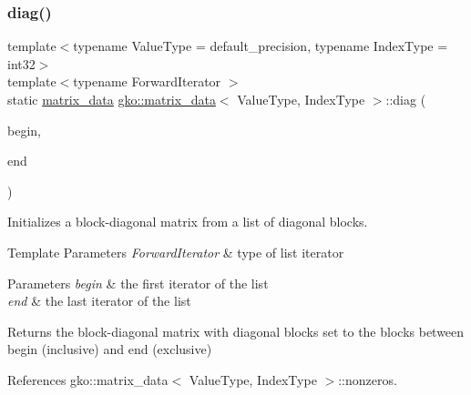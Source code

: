 \subsubsection{\texorpdfstring{diag()}{diag()}\hspace{0.1cm}{\footnotesize\ttfamily [4/5]}}
{\footnotesize\ttfamily template$<$typename Value\+Type = default\+\_\+precision, typename Index\+Type = int32$>$ \\
template$<$typename Forward\+Iterator $>$ \\
static \hyperlink{structgko_1_1matrix__data}{matrix\+\_\+data} \hyperlink{structgko_1_1matrix__data}{gko\+::matrix\+\_\+data}$<$ Value\+Type, Index\+Type $>$\+::diag (\begin{DoxyParamCaption}\item[{Forward\+Iterator}]{begin,  }\item[{Forward\+Iterator}]{end }\end{DoxyParamCaption})\hspace{0.3cm}{\ttfamily [static]}}



Initializes a block-\/diagonal matrix from a list of diagonal blocks. 


\begin{DoxyTemplParams}{Template Parameters}
{\em Forward\+Iterator} & type of list iterator\\
\hline
\end{DoxyTemplParams}

\begin{DoxyParams}{Parameters}
{\em begin} & the first iterator of the list \\
\hline
{\em end} & the last iterator of the list\\
\hline
\end{DoxyParams}
\begin{DoxyReturn}{Returns}
the block-\/diagonal matrix with diagonal blocks set to the blocks between begin (inclusive) and end (exclusive) 
\end{DoxyReturn}


References gko\+::matrix\+\_\+data$<$ Value\+Type, Index\+Type $>$\+::nonzeros.

\mbox{\label{structgko_1_1matrix__data_aa809c5fbd147b72b18efeca595338398}} 
